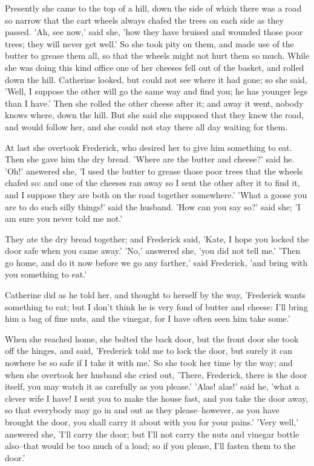 \documentclass[12pt]{book}
\begin{document}
Presently she came to the top of a hill, down the side of which there
was a road so narrow that the cart wheels always chafed the trees on
each side as they passed. 'Ah, see now,' said she, 'how they have
bruised and wounded those poor trees; they will never get well.' So
she took pity on them, and made use of the butter to grease them all,
so that the wheels might not hurt them so much. While she was doing
this kind office one of her cheeses fell out of the basket, and rolled
down the hill. Catherine looked, but could not see where it had gone;
so she said, 'Well, I suppose the other will go the same way and find
you; he has younger legs than I have.' Then she rolled the other
cheese after it; and away it went, nobody knows where, down the hill.
But she said she supposed that they knew the road, and would follow
her, and she could not stay there all day waiting for them.

At last she overtook Frederick, who desired her to give him something
to eat. Then she gave him the dry bread. 'Where are the butter and
cheese?' said he. 'Oh!' answered she, 'I used the butter to grease
those poor trees that the wheels chafed so: and one of the cheeses ran
away so I sent the other after it to find it, and I suppose they are
both on the road together somewhere.' 'What a goose you are to do such
silly things!' said the husband. 'How can you say so?' said she; 'I am
sure you never told me not.'

They ate the dry bread together; and Frederick said, 'Kate, I hope you
locked the door safe when you came away.' 'No,' answered she, 'you did
not tell me.' 'Then go home, and do it now before we go any farther,'
said Frederick, 'and bring with you something to eat.'

Catherine did as he told her, and thought to herself by the way,
'Frederick wants something to eat; but I don't think he is very fond
of butter and cheese: I'll bring him a bag of fine nuts, and the
vinegar, for I have often seen him take some.'

When she reached home, she bolted the back door, but the front door
she took off the hinges, and said, 'Frederick told me to lock the
door, but surely it can nowhere be so safe if I take it with me.' So
she took her time by the way; and when she overtook her husband she
cried out, 'There, Frederick, there is the door itself, you may watch
it as carefully as you please.' 'Alas! alas!' said he, 'what a clever
wife I have! I sent you to make the house fast, and you take the door
away, so that everybody may go in and out as they please--however, as
you have brought the door, you shall carry it about with you for your
pains.' 'Very well,' answered she, 'I'll carry the door; but I'll not
carry the nuts and vinegar bottle also--that would be too much of a
load; so if you please, I'll fasten them to the door.'
\end{document}
